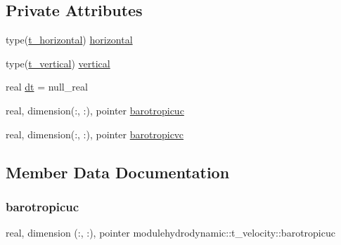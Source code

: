 \subsection*{Private Attributes}
\begin{DoxyCompactItemize}
\item 
type(\mbox{\hyperlink{structmodulehydrodynamic_1_1t__horizontal}{t\+\_\+horizontal}}) \mbox{\hyperlink{structmodulehydrodynamic_1_1t__velocity_a2b4263bf8416a6bc1695d7b48aaeb583}{horizontal}}
\item 
type(\mbox{\hyperlink{structmodulehydrodynamic_1_1t__vertical}{t\+\_\+vertical}}) \mbox{\hyperlink{structmodulehydrodynamic_1_1t__velocity_a019b9d29b55014ecb90cd3cc31b4a186}{vertical}}
\item 
real \mbox{\hyperlink{structmodulehydrodynamic_1_1t__velocity_ac9d324c70103f53f724cfd2464faae14}{dt}} = null\+\_\+real
\item 
real, dimension(\+:, \+:), pointer \mbox{\hyperlink{structmodulehydrodynamic_1_1t__velocity_a52cee4483241e2ccb0e41bffe5f6c698}{barotropicuc}}
\item 
real, dimension(\+:, \+:), pointer \mbox{\hyperlink{structmodulehydrodynamic_1_1t__velocity_a310c0fe072b740dd71b12e6195611111}{barotropicvc}}
\end{DoxyCompactItemize}


\subsection{Member Data Documentation}
\mbox{\label{structmodulehydrodynamic_1_1t__velocity_a52cee4483241e2ccb0e41bffe5f6c698}} 
\subsubsection{\texorpdfstring{barotropicuc}{barotropicuc}}
{\footnotesize\ttfamily real, dimension (\+:, \+:), pointer modulehydrodynamic\+::t\+\_\+velocity\+::barotropicuc\hspace{0.3cm}{\ttfamily [private]}}

\mbox{\label{structmodulehydrodynamic_1_1t__velocity_a310c0fe072b740dd71b12e6195611111}} 
